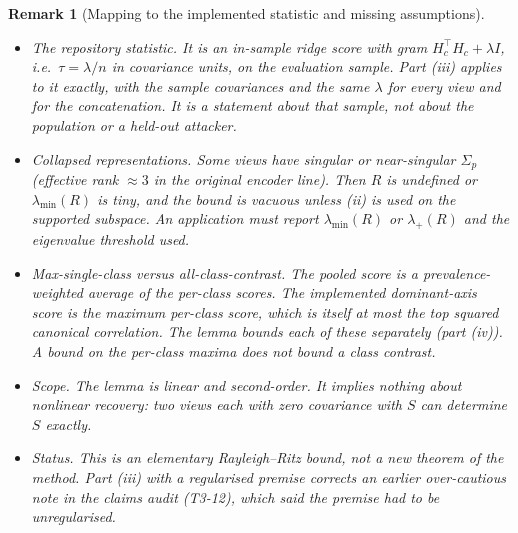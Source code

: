 \documentclass{article}
\newtheorem*{remark}{Remark}
\begin{document}
\begin{remark}[Mapping to the implemented statistic and missing assumptions]
\begin{itemize}
\item \emph{The repository statistic.} It is an in-sample ridge score with gram
$H_c^\top H_c+\lambda I$, i.e.\ $\tau=\lambda/n$ in covariance units, on the evaluation sample. Part (iii)
applies to it exactly, with the \emph{sample} covariances and the same $\lambda$ for every view and for
the concatenation. It is a statement about that sample, not about the population or a held-out attacker.
\item \emph{Collapsed representations.} Some views have singular or near-singular $\Sigma_p$ (effective
rank $\approx3$ in the original encoder line). Then $R$ is undefined or $\lambda_{\min}(R)$ is tiny, and
the bound is vacuous unless (ii) is used on the supported subspace. An application must report
$\lambda_{\min}(R)$ or $\lambda_+(R)$ and the eigenvalue threshold used.
\item \emph{Max-single-class versus all-class-contrast.} The pooled score is a prevalence-weighted
average of the per-class scores. The implemented dominant-axis score is the maximum per-class score,
which is itself at most the top squared canonical correlation. The lemma bounds each of these
separately (part (iv)). A bound on the per-class maxima does not bound a class contrast.
\item \emph{Scope.} The lemma is linear and second-order. It implies nothing about nonlinear recovery:
two views each with zero covariance with $S$ can determine $S$ exactly.
\item \emph{Status.} This is an elementary Rayleigh--Ritz bound, not a new theorem of the method. Part
(iii) with a regularised premise corrects an earlier over-cautious note in the claims audit (T3-12),
which said the premise had to be unregularised.
\end{itemize}
\end{remark}
\end{document}
